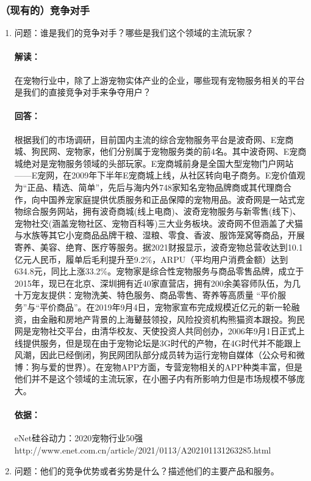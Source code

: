 \documentclass[a4paper]{ctexart}
\begin{document}
\subsubsection{（现有的）竞争对手}
\begin{enumerate}[label=\alph*.]
  \item 问题：谁是我们的竞争对手？哪些是我们这个领域的主流玩家？
  \paragraph{解读：}在宠物行业中，除了上游宠物实体产业的企业，哪些现有宠物服务相关的平台是我们的直接竞争对手来争夺用户？
  \paragraph{回答：}根据我们的市场调研，目前国内主流的综合宠物服务平台是波奇网、E宠商城、狗民网、宠物家，他们分别属于宠物服务类的前4名。其中波奇网、E宠商城绝对是宠物服务领域的头部玩家。E宠商城前身是全国大型宠物门户网站——E宠网，在2009年下半年E宠商城上线，从社区转向电子商务。E宠价值观为“正品、精选、简单”，先后与海内外748家知名宠物品牌商或其代理商合作，向中国养宠家庭提供优质服务和正品保障的宠物用品。波奇网是一站式宠物综合服务网站，拥有波奇商城(线上电商)、波奇宠物服务与新零售(线下)、宠物社交(涵盖宠物社区、宠物百科等)三大业务板块。波奇网不但涵盖了犬猫与水族等其它小宠商品品牌干粮、湿粮、零食、香波、服饰笼窝等商品，开展寄养、美容、绝育、医疗等服务。据2021财报显示，波奇宠物总营收达到10.1亿元人民币，履单后毛利提升至9.2\%，ARPU（平均用户消费金额）达到634.8元，同比上涨33.2\%。宠物家是综合性宠物服务与商品零售品牌，成立于2015年，现已在北京、深圳拥有近40家直营店，拥有200余美容师队伍，为几十万宠友提供：宠物洗美、特⾊服务、商品零售、寄养等高质量 “平价服务”与“平价商品”。在2019年9月4日，宠物家宣布完成规模近亿元的新一轮融资，由金融和房地产背景的上海鼙鼓领投，风险投资机构熊猫资本跟投。狗民网是宠物社交平台，由清华校友、天使投资人共同创办，2006年9月1日正式上线提供服务，但是现在由于宠物论坛是3G时代的产物，在4G时代并不能跟上风潮，因此已经倒闭，狗民网团队部分成员转为运行宠物自媒体（公众号和微博：狗与爱的世界）。在宠物APP方面，专营宠物相关的APP种类丰富，但是他们并不是这个领域的主流玩家，在小圈子内有所影响力但是市场规模不够庞大。
  \paragraph{依据：}eNet硅谷动力：2020宠物行业50强\\ http://www.enet.com.cn/article/2021/0113/A202101131263285.html
  \item 问题：他们的竞争优势或者劣势是什么？描述他们的主要产品和服务。

\end{enumerate}
\end{document}
